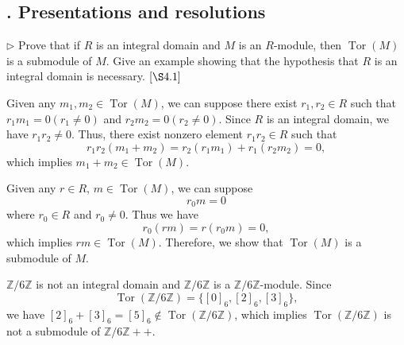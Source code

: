 \subsection{. Presentations and resolutions}
\begin{problem}[4.1]
$\triangleright$ Prove that if $R$ is an integral domain and $M$ is an $R$-module, then $\operatorname{Tor}(M)$ is a submodule of $M$. Give an example showing that the hypothesis that $R$ is an integral domain is necessary. $[\S 4.1]$
\end{problem}
\begin{solution}
Given any $m_1,m_2\in\operatorname{Tor}(M)$, we can suppose there exist $r_1,r_2\in R$ such that $r_1m_1=0(r_1\ne0)$ and $r_2m_2=0(r_2\ne0)$. Since $R$ is an integral domain, we have $r_1r_2\ne0$. Thus, there exist nonzero element $r_1r_2\in R$ such that 
$$
r_1r_2(m_1+m_2)=r_2(r_1m_1)+r_1(r_2m_2)=0,
$$
which implies $m_1+m_2\in\operatorname{Tor}(M)$.

Given any $r\in R$, $m\in\operatorname{Tor}(M)$, we can suppose
\[
r_0m=0
\]
where $r_0\in R$ and $r_0\ne0$. Thus we have
\[
r_0(rm)=r(r_0m)=0,
\]
which implies $rm\in\operatorname{Tor}(M)$. Therefore, we show that $\operatorname{Tor}(M)$ is a submodule of $M$.

$\mathbb{Z}/6\mathbb{Z}$ is not an integral domain and $\mathbb{Z}/6\mathbb{Z}$ is a $\mathbb{Z}/6\mathbb{Z}$-module. Since
\[
\operatorname{Tor}(\mathbb{Z}/6\mathbb{Z})=\{[0]_6,[2]_6,[3]_6\},
\]
we have $[2]_6+[3]_6=[5]_6\notin \operatorname{Tor}(\mathbb{Z}/6\mathbb{Z})$, which implies $\operatorname{Tor}(\mathbb{Z}/6\mathbb{Z})$ is not a submodule of $\mathbb{Z}/6\mathbb{Z}
++$.
\end{solution}





